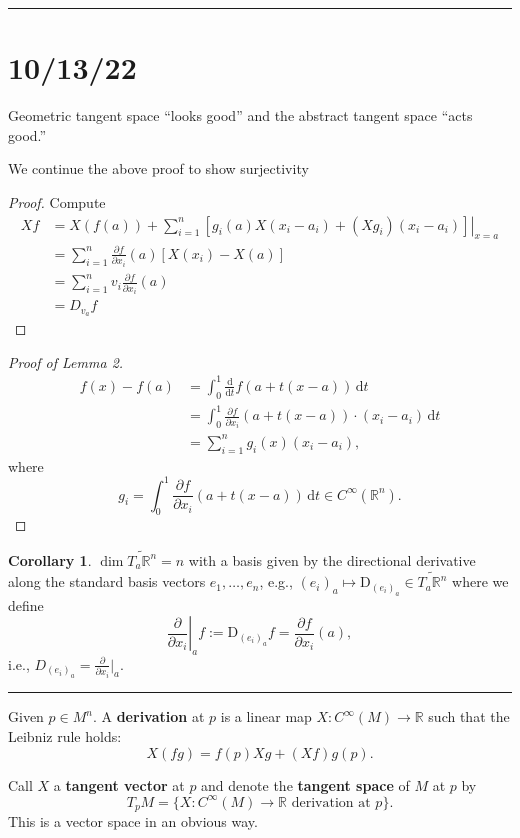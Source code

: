 \documentclass[12pt]{article}
\newcommand{\keyword}[1]{\textbf{#1}}
\newcommand{\sepline}{\rule{\textwidth}{0.4pt}}
\theoremstyle{definition}
\newtheorem{corollary}{Corollary}
\newcommand{\R}{\mathbb{R}}
\newcommand{\<}{\left\langle}
\renewcommand{\>}{\right\rangle}
\newcommand{\dd}{\mathrm{d}}
\newcommand{\DD}{\mathrm{D}}
\newcommand{\pdv}[2]{\frac{\partial #1}{\partial #2}}
\newcommand{\odv}[2]{\frac{\dd #1}{\dd #2}}
\newcommand{\eval}[1]{\left.#1\right|}
\renewcommand{\tilde}{\widetilde}
\begin{document}
\sepline

\section*{10/13/22}

Geometric tangent space ``looks good'' and the abstract tangent space ``acts good.''

We continue the above proof to show surjectivity

\begin{proof}
    Compute
    \begin{align*}
        Xf
            &= X(f(a)) + \sum_{i=1}^{n} \eval{[g_i(a) X(x_i - a_i) + (Xg_i)(x_i - a_i)]}_{x = a} \\
            &= \sum_{i=1}^{n} \pdv{f}{x_i}(a) [X(x_i) - X(a)] \\
            &= \sum_{i=1}^{n} v_i \pdv{f}{x_i}(a) \\
            &= D_{v_a}f
    \end{align*}
\end{proof}


\begin{proof}[Proof of Lemma 2]
    \begin{align*}
        f(x) - f(a)
            &= \int_{0}^{1} \odv{}{t} f(a + t(x - a)) \,\dd{t} \\
            &= \int_{0}^{1} \pdv{f}{x_i}(a + t(x - a)) \cdot (x_i - a_i) \,\dd{t} \\
            &= \sum_{i=1}^{n} g_i(x)(x_i - a_i),
    \end{align*}
    where
    \[
        g_i = \int_{0}^{1} \pdv{f}{x_i}(a + t(x - a)) \,\dd{t} \in C^\infty(\R^n).
    \]
\end{proof}


\begin{corollary}
    $\dim \tilde{T_a\R^n} = n$ with a basis given by the directional derivative along the standard basis vectors $e_1, \dots, e_n$, e.g., $(e_i)_a \mapsto \DD_{(e_i)_a} \in \tilde{T_a\R^n}$ where we define
    \[
        \eval{\pdv{}{x_i}}_a f := \DD_{(e_i)_a}f = \pdv{f}{x_i}(a),
    \]
    i.e., $D_{(e_i)_a} = \pdv{}{x_i}\big|_a$.
\end{corollary}

\sepline

Given $p \in M^n$.
A \keyword{derivation} at $p$ is a linear map $X : C^\infty(M) \to \R$ such that the Leibniz rule holds:
\[
    X(fg) = f(p)Xg + (Xf)g(p).
\]

Call $X$ a \keyword{tangent vector} at $p$ and denote the \keyword{tangent space} of $M$ at $p$ by
\[
    T_pM = \{X : C^\infty(M) \to \R \text{ derivation at } p\}.
\]
This is a vector space in an obvious way.
\end{document}
